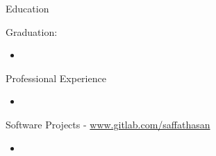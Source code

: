\documentclass[]{mcdowellcv}
\begin{document}
	\makeheader
	
	\begin{cvsection}{Education}
		\begin{cvsubsection}{}{}{Graduation: }
			\begin{itemize}
				\item {}
			\end{itemize}
		\end{cvsubsection}
	\end{cvsection}

	\begin{cvsection}{Professional Experience}
		\begin{cvsubsection}{}{}{}
			\begin{itemize}
				\item {}
			\end{itemize}
	    \end{cvsubsection}
	\end{cvsection}
	
	\begin{cvsection}{Software Projects - \url{www.gitlab.com/saffathasan}}
		\begin{cvsubsection}{}{}{}
			\begin{itemize}
				\item {}
			\end{itemize}
	    \end{cvsubsection}
	\end{cvsection}

	
\end{document}
